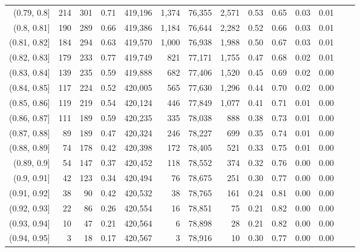 \begin{tabular}{rrrrrrrrrrrrrr}
(0.79, 0.8]    &     214 &    301 &    0.71 &  419,196 &    1,374 &  76,355 &   2,571 &  0.53 &  0.65 &  0.03 &      0.01 \\
(0.8, 0.81]    &     190 &    289 &    0.66 &  419,386 &    1,184 &  76,644 &   2,282 &  0.52 &  0.66 &  0.03 &      0.01 \\
(0.81, 0.82]   &     184 &    294 &    0.63 &  419,570 &    1,000 &  76,938 &   1,988 &  0.50 &  0.67 &  0.03 &      0.01 \\
(0.82, 0.83]   &     179 &    233 &    0.77 &  419,749 &      821 &  77,171 &   1,755 &  0.47 &  0.68 &  0.02 &      0.01 \\
(0.83, 0.84]   &     139 &    235 &    0.59 &  419,888 &      682 &  77,406 &   1,520 &  0.45 &  0.69 &  0.02 &      0.00 \\
(0.84, 0.85]   &     117 &    224 &    0.52 &  420,005 &      565 &  77,630 &   1,296 &  0.44 &  0.70 &  0.02 &      0.00 \\
(0.85, 0.86]   &     119 &    219 &    0.54 &  420,124 &      446 &  77,849 &   1,077 &  0.41 &  0.71 &  0.01 &      0.00 \\
(0.86, 0.87]   &     111 &    189 &    0.59 &  420,235 &      335 &  78,038 &     888 &  0.38 &  0.73 &  0.01 &      0.00 \\
(0.87, 0.88]   &      89 &    189 &    0.47 &  420,324 &      246 &  78,227 &     699 &  0.35 &  0.74 &  0.01 &      0.00 \\
(0.88, 0.89]   &      74 &    178 &    0.42 &  420,398 &      172 &  78,405 &     521 &  0.33 &  0.75 &  0.01 &      0.00 \\
(0.89, 0.9]    &      54 &    147 &    0.37 &  420,452 &      118 &  78,552 &     374 &  0.32 &  0.76 &  0.00 &      0.00 \\
(0.9, 0.91]    &      42 &    123 &    0.34 &  420,494 &       76 &  78,675 &     251 &  0.30 &  0.77 &  0.00 &      0.00 \\
(0.91, 0.92]   &      38 &     90 &    0.42 &  420,532 &       38 &  78,765 &     161 &  0.24 &  0.81 &  0.00 &      0.00 \\
(0.92, 0.93]   &      22 &     86 &    0.26 &  420,554 &       16 &  78,851 &      75 &  0.21 &  0.82 &  0.00 &      0.00 \\
(0.93, 0.94]   &      10 &     47 &    0.21 &  420,564 &        6 &  78,898 &      28 &  0.21 &  0.82 &  0.00 &      0.00 \\
(0.94, 0.95]   &       3 &     18 &    0.17 &  420,567 &        3 &  78,916 &      10 &  0.30 &  0.77 &  0.00 &      0.00 \\

\end{tabular}
